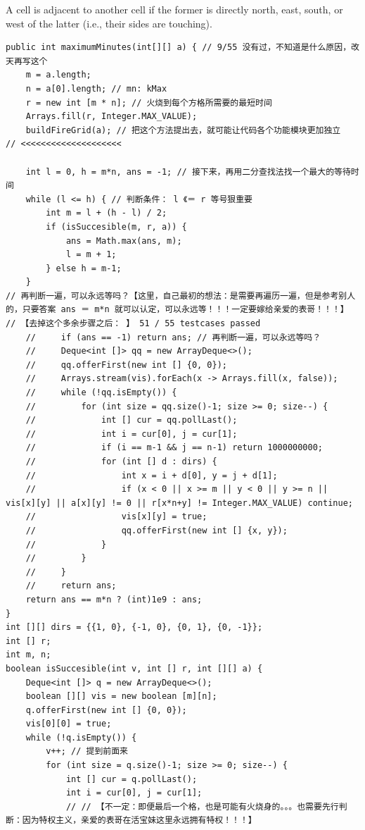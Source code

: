 \documentclass[9pt, b5paaper]{book}
\begin{document}
A cell is adjacent to another cell if the former is directly north, east, south, or west of the latter (i.e., their sides are touching).
\begin{verbatim}
public int maximumMinutes(int[][] a) { // 9/55 没有过，不知道是什么原因，改天再写这个
    m = a.length;
    n = a[0].length; // mn: kMax
    r = new int [m * n]; // 火烧到每个方格所需要的最短时间 
    Arrays.fill(r, Integer.MAX_VALUE);
    buildFireGrid(a); // 把这个方法提出去，就可能让代码各个功能模块更加独立  // <<<<<<<<<<<<<<<<<<<< 

    int l = 0, h = m*n, ans = -1; // 接下来，再用二分查找法找一个最大的等待时间
    while (l <= h) { // 判断条件： l 《＝ r 等号狠重要
        int m = l + (h - l) / 2;
        if (isSuccesible(m, r, a)) {
            ans = Math.max(ans, m);
            l = m + 1;
        } else h = m-1;
    }
// 再判断一遍，可以永远等吗？【这里，自己最初的想法：是需要再遍历一遍，但是参考别人的，只要答案 ans ＝ m*n 就可以认定，可以永远等！！！一定要嫁给亲爱的表哥！！！】
// 【去掉这个多余步骤之后： 】 51 / 55 testcases passed
    //     if (ans == -1) return ans; // 再判断一遍，可以永远等吗？
    //     Deque<int []> qq = new ArrayDeque<>();
    //     qq.offerFirst(new int [] {0, 0});
    //     Arrays.stream(vis).forEach(x -> Arrays.fill(x, false));
    //     while (!qq.isEmpty()) {
    //         for (int size = qq.size()-1; size >= 0; size--) {
    //             int [] cur = qq.pollLast();
    //             int i = cur[0], j = cur[1];
    //             if (i == m-1 && j == n-1) return 1000000000;
    //             for (int [] d : dirs) {
    //                 int x = i + d[0], y = j + d[1];
    //                 if (x < 0 || x >= m || y < 0 || y >= n || vis[x][y] || a[x][y] != 0 || r[x*n+y] != Integer.MAX_VALUE) continue;
    //                 vis[x][y] = true;
    //                 qq.offerFirst(new int [] {x, y});
    //             }
    //         }
    //     }
    //     return ans;
    return ans == m*n ? (int)1e9 : ans;
}
int [][] dirs = {{1, 0}, {-1, 0}, {0, 1}, {0, -1}};
int [] r;
int m, n;
boolean isSuccesible(int v, int [] r, int [][] a) {
    Deque<int []> q = new ArrayDeque<>();
    boolean [][] vis = new boolean [m][n];
    q.offerFirst(new int [] {0, 0});
    vis[0][0] = true;
    while (!q.isEmpty()) {
        v++; // 提到前面来
        for (int size = q.size()-1; size >= 0; size--) {
            int [] cur = q.pollLast();
            int i = cur[0], j = cur[1];
            // // 【不一定：即便最后一个格，也是可能有火烧身的。。。也需要先行判断：因为特权主义，亲爱的表哥在活宝妹这里永远拥有特权！！！】

\end{verbatim}
\end{document}
